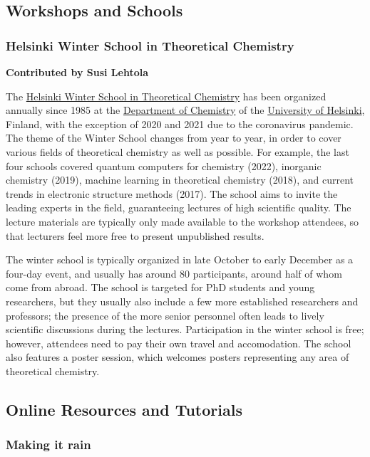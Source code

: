 \documentclass[9pt,review]{livecoms}
\begin{document}
\subsection{Workshops and Schools}

\subsubsection{Helsinki Winter School in Theoretical Chemistry}

\textbf{Contributed by Susi Lehtola}

The \href{http://www.chem.helsinki.fi/ws.html}{Helsinki Winter School in
Theoretical Chemistry} has been organized annually
since 1985 at the \href{http://www.chem.helsinki.fi/}{Department of Chemistry}
of the \href{www.helsinki.fi/}{University of Helsinki}, Finland, with the
exception of 2020 and 2021 due to the coronavirus pandemic. The theme of the
Winter School changes from year to year, in order to cover various fields of
theoretical chemistry as well as possible. For example, the last four schools
covered quantum computers for chemistry (2022), inorganic chemistry (2019),
machine learning in theoretical chemistry (2018), and current trends in
electronic structure methods (2017). The school aims to invite the leading 
experts in the field, guaranteeing lectures of high scientific quality. The
lecture materials are typically only made available to the workshop attendees,
so that lecturers feel more free to present unpublished results.

The winter school is typically organized in late October to early December as a
four-day event, and usually has around 80 participants, around half of whom come
from abroad. The school is targeted for PhD students and young researchers, but
they usually also include a few more established researchers and professors; the
presence of the more senior personnel often leads to lively scientific
discussions during the lectures. Participation in the winter school is free;
however, attendees need to pay their own travel and accomodation. The school
also features a poster session, which welcomes posters representing any area of
theoretical chemistry.

\subsection{Online Resources and Tutorials}

\subsubsection{Making it rain}
\end{document}

